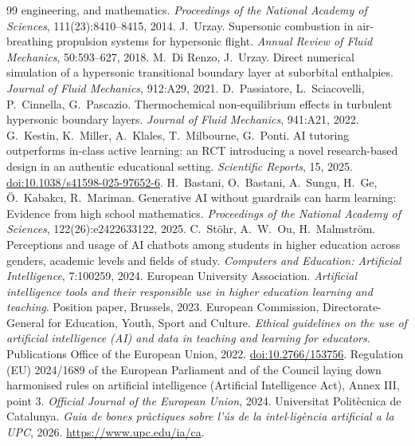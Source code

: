 \documentclass[11pt]{article}
\begin{document}
\begin{thebibliography}{99}
engineering, and mathematics. \emph{Proceedings of the National Academy of Sciences},
111(23):8410--8415, 2014.
 J.\ Urzay. Supersonic combustion in air-breathing propulsion systems for
hypersonic flight. \emph{Annual Review of Fluid Mechanics}, 50:593--627, 2018.
 M.\ Di Renzo, J.\ Urzay. Direct numerical simulation of a
hypersonic transitional boundary layer at suborbital enthalpies. \emph{Journal of Fluid
Mechanics}, 912:A29, 2021.
 D.\ Passiatore, L.\ Sciacovelli, P.\ Cinnella, G.\ Pascazio.
Thermochemical non-equilibrium effects in turbulent hypersonic boundary layers.
\emph{Journal of Fluid Mechanics}, 941:A21, 2022.
 G.\ Kestin, K.\ Miller, A.\ Klales, T.\ Milbourne, G.\ Ponti. AI tutoring
outperforms in-class active learning: an RCT introducing a novel research-based design in an
authentic educational setting. \emph{Scientific Reports}, 15, 2025.
\href{https://doi.org/10.1038/s41598-025-97652-6}{doi:10.1038/s41598-025-97652-6}.
 H.\ Bastani, O.\ Bastani, A.\ Sungu, H.\ Ge, \"O.\ Kabakc\i{}, R.\
Mariman. Generative AI without guardrails can harm learning: Evidence from high school
mathematics. \emph{Proceedings of the National Academy of Sciences}, 122(26):e2422633122,
2025.
 C.\ St\"ohr, A.\ W.\ Ou, H.\ Malmstr\"om. Perceptions and usage of AI
chatbots among students in higher education across genders, academic levels and fields of
study. \emph{Computers and Education: Artificial Intelligence}, 7:100259, 2024.
\bibitem{EUA2023} European University Association. \emph{Artificial intelligence tools and
their responsible use in higher education learning and teaching}. Position paper,
Brussels, 2023.
 European Commission, Directorate-General for Education, Youth, Sport and
Culture. \emph{Ethical guidelines on the use of artificial intelligence (AI) and data in
teaching and learning for educators}. Publications Office of the European Union, 2022.
\href{https://data.europa.eu/doi/10.2766/153756}{doi:10.2766/153756}.
\bibitem{AIAct2024} Regulation (EU) 2024/1689 of the European Parliament and of the Council
laying down harmonised rules on artificial intelligence (Artificial Intelligence Act),
Annex III, point 3. \emph{Official Journal of the European Union}, 2024.
\bibitem{UPCAI2026} Universitat Polit\`ecnica de Catalunya. \emph{Guia de bones pr\`actiques
sobre l'\'us de la intel$\cdot$lig\`encia artificial a la UPC}, 2026.
\url{https://www.upc.edu/ia/ca}.

\end{thebibliography}
\end{document}
